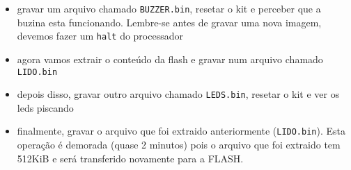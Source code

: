 \documentclass[a4paper,10pt]{article}
\begin{document}
\begin{itemize}
 \item  gravar um arquivo chamado \texttt{BUZZER.bin}, resetar o kit e perceber que a buzina esta funcionando. Lembre-se antes de gravar uma nova imagem, devemos fazer um \verb|halt| do processador
 
 
 \item agora vamos extrair o conteúdo da flash e gravar num arquivo chamado \texttt{LIDO.bin}
 
 \item depois disso,  gravar outro arquivo chamado \texttt{LEDS.bin}, resetar o kit e ver os leds piscando
 
 \item finalmente, gravar o arquivo que foi extraido anteriormente (\texttt{LIDO.bin}). Esta operação é demorada (quase 2 minutos) pois o arquivo que foi extraido tem 512KiB e será transferido novamente para a FLASH.

\end{itemize}
\end{document}
